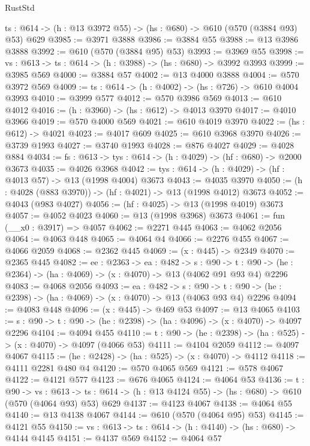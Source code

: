 \begin{lexlean}{RustStd}
\begin{coremodule}
  {ts : @614} -> (h : @13 @3972 @55) -> (hs : @680) -> @610 (@570 (@3884 @93) @53) @629
@3985 := @3971 @3888
@3986 := @3884 @55
@3988 := @13 @3986 @3888
@3992 := @610 (@570 (@3884 @95) @53)
@3993 := @3969 @55
@3998 := {vs : @613} -> {ts : @614} -> (h : @3988) -> (hs : @680) -> @3992 @3993
@3999 := @3985 @569
@4000 := @3884 @57
@4002 := @13 @4000 @3888
@4004 := @570 @3972 @569
@4009 := {ts : @614} -> (h : @4002) -> (hs : @726) -> @610 @4004 @3993
@4010 := @3999 @577
@4012 := @570 @3986 @569
@4013 := @610 @4012
@4016 := (h : @3960) -> (hs : @612) -> @4013 @3970
@4017 := @4010 @3966
@4019 := @570 @4000 @569
@4021 := @610 @4019 @3970
@4022 := (hs : @612) -> @4021
@4023 := @4017 @609
@4025 := @610 @3968 @3970
@4026 := @3739 @1993
@4027 := @3740 @1993
@4028 := @876 @4027
@4029 := @4028 @884
@4034 := {fs : @613} -> {tys : @614} -> (h : @4029) -> (hf : @680) -> @2000 @3673
@4035 := @4026 @3968
@4042 := {tys : @614} -> (h : @4029) -> (hf : @4013 @57) -> @13 (@1998 @4004) @3673
@4043 := @4035 @3970
@4050 := (h : @4028 (@883 @3970)) -> (hf : @4021) -> @13 (@1998 @4012) @3673
@4052 := @4043 (@983 @4027)
@4056 := (hf : @4025) -> @13 (@1998 @4019) @3673
@4057 := @4052 @4023
@4060 := @13 (@1998 @3968) @3673
@4061 := fun (__x0 : @3917) => @4057
@4062 := @2271 @445
@4063 := @4062 @2056
@4064 := @4063 @448
@4065 := @4064 @4
@4066 := @2276 @455
@4067 := @4066 @2059
@4068 := @2362 @445
@4069 := (x : @445) -> @2349
@4070 := @2365 @445
@4082 := {ee : @2363} ->
  {ea : @482} ->
  {s : @90} ->
  {t : @90} -> (he : @2364) -> (ha : @4069) -> (x : @4070) -> @13 (@4062 @91 @93 @4) @2296
@4083 := @4068 @2056
@4093 := {ea : @482} ->
  {s : @90} -> {t : @90} -> (he : @2398) -> (ha : @4069) -> (x : @4070) -> @13 (@4063 @93 @4) @2296
@4094 := @4083 @448
@4096 := (x : @445) -> @469 @53
@4097 := @13 @4065
@4103 := {s : @90} -> {t : @90} -> (he : @2398) -> (ha : @4096) -> (x : @4070) -> @4097 @2296
@4104 := @4094 @455
@4110 := {t : @90} -> (he : @2398) -> (ha : @525) -> (x : @4070) -> @4097 (@4066 @53)
@4111 := @4104 @2059
@4112 := @4097 @4067
@4115 := (he : @2428) -> (ha : @525) -> (x : @4070) -> @4112
@4118 := @4111 @2281 @480 @4
@4120 := @570 @4065 @569
@4121 := @578 @4067
@4122 := @4121 @577
@4123 := @676 @4065
@4124 := @4064 @53
@4136 := {t : @90} ->
  {vs : @613} ->
  {ts : @614} -> (h : @13 @4124 @55) -> (hs : @680) -> @610 (@570 (@4064 @93) @53) @629
@4137 := @4123 @4067
@4138 := @4064 @55
@4140 := @13 @4138 @4067
@4144 := @610 (@570 (@4064 @95) @53)
@4145 := @4121 @55
@4150 := {vs : @613} -> {ts : @614} -> (h : @4140) -> (hs : @680) -> @4144 @4145
@4151 := @4137 @569
@4152 := @4064 @57

\end{coremodule}
\end{lexlean}
